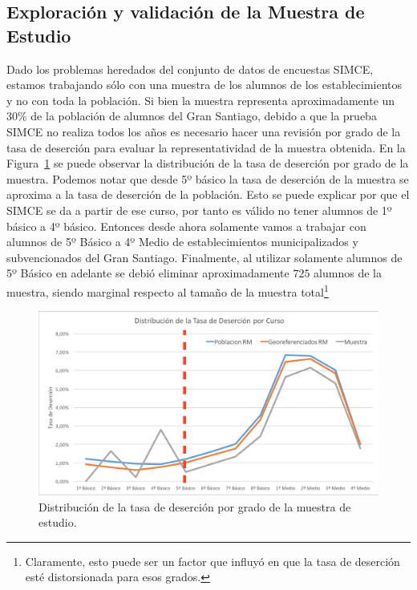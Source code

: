\subsection{Exploración y validación de la Muestra de Estudio}
Dado los problemas heredados del conjunto de datos de encuestas SIMCE, estamos trabajando sólo con una muestra de los alumnos de los establecimientos y no con toda la población. Si bien la muestra representa aproximadamente un 30\% de la población de alumnos del Gran Santiago, debido a que la prueba SIMCE no realiza todos los años es necesario hacer una revisión por grado de la tasa de deserción para evaluar la representatividad de la muestra obtenida. En la Figura~\ref{fig:deserciongradomuestra} se puede observar la distribución de la tasa de deserción por grado de la muestra. Podemos notar que desde 5º básico la tasa de deserción de la muestra se aproxima a la tasa de deserción de la población. Esto se puede explicar por que el SIMCE se da a partir de ese curso, por tanto es válido no tener alumnos de 1º básico a 4º básico. Entonces desde ahora solamente vamos a trabajar con alumnos de 5º Básico a 4º Medio de establecimientos municipalizados y subvencionados del Gran Santiago.
Finalmente, al utilizar solamente alumnos de 5º Básico en adelante se debió eliminar aproximadamente $725$ alumnos de la muestra, siendo marginal respecto al tamaño de la muestra total\footnote{Claramente, esto puede ser un factor que influyó en que la tasa de deserción esté distorsionada para esos grados.}
\begin{figure}[H]
  \centering
    \includegraphics[trim=0cm 0cm 0cm 0cm,scale=0.5]{Figuras/6SolucionPropuesta/testdist1.png}
      \caption{Distribución de la tasa de deserción por grado de la muestra de estudio.}
    \label{fig:deserciongradomuestra}
\end{figure}


